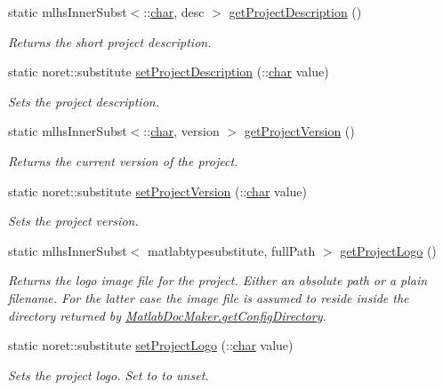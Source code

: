\begin{DoxyCompactItemize}
static mlhs\+Inner\+Subst$<$\+::\hyperlink{classchar}{char}, desc $>$ \hyperlink{class_matlab_doc_maker_af63bb7f2a5008a7b786d2b83b4f72b1b}{get\+Project\+Description} ()
\begin{DoxyCompactList}\small\item\em Returns the short project description. \end{DoxyCompactList}\item 
static noret\+::substitute \hyperlink{class_matlab_doc_maker_a88037a33f6ed26b8b3e60e1cbfd5dfd6}{set\+Project\+Description} (\+::\hyperlink{classchar}{char} value)
\begin{DoxyCompactList}\small\item\em Sets the project description. \end{DoxyCompactList}\item 
static mlhs\+Inner\+Subst$<$\+::\hyperlink{classchar}{char}, version $>$ \hyperlink{class_matlab_doc_maker_afce5384fb7c395546431b7a6c4e1f790}{get\+Project\+Version} ()
\begin{DoxyCompactList}\small\item\em Returns the current version of the project. \end{DoxyCompactList}\item 
static noret\+::substitute \hyperlink{class_matlab_doc_maker_a532ff6bc4beaeff5c3d2f12305bbaa5d}{set\+Project\+Version} (\+::\hyperlink{classchar}{char} value)
\begin{DoxyCompactList}\small\item\em Sets the project version. \end{DoxyCompactList}\item 
static mlhs\+Inner\+Subst$<$ matlabtypesubstitute, full\+Path $>$ \hyperlink{class_matlab_doc_maker_a6767085b13dc2600cb6beda7f7d6acd9}{get\+Project\+Logo} ()
\begin{DoxyCompactList}\small\item\em Returns the logo image file for the project. Either an absolute path or a plain filename. For the latter case the image file is assumed to reside inside the directory returned by \hyperlink{class_matlab_doc_maker_a11a2a8ec616df969a911b325e39b0b4f}{Matlab\+Doc\+Maker.\+get\+Config\+Directory}. \end{DoxyCompactList}\item 
static noret\+::substitute \hyperlink{class_matlab_doc_maker_a6e84afe2189a851665133b6e7c412d4c}{set\+Project\+Logo} (\+::\hyperlink{classchar}{char} value)
\begin{DoxyCompactList}\small\item\em Sets the project logo. Set to \textquotesingle{} to unset. \end{DoxyCompactList}\item 

\end{DoxyCompactItemize}
